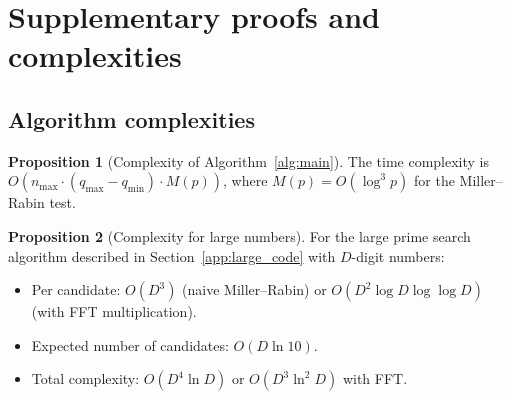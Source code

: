\documentclass[11pt,a4paper]{article}
\theoremstyle{definition}
\newtheorem{proposition}{Proposition}[section]
\theoremstyle{plain}
\begin{document}
\section{Supplementary proofs and complexities}
\label{app:proofs}

\subsection{Algorithm complexities}

\begin{proposition}[Complexity of Algorithm~\ref{alg:main}]
The time complexity is $O(n_{\max} \cdot (q_{\max} - q_{\min}) \cdot M(p))$, where $M(p) = O(\log^3 p)$ for the Miller--Rabin test.
\end{proposition}

\begin{proposition}[Complexity for large numbers]
For the large prime search algorithm described in Section~\ref{app:large_code} with $D$-digit numbers:
\begin{itemize}[leftmargin=*]
    \item Per candidate: $O(D^3)$ (naive Miller--Rabin) or $O(D^2 \log D \log \log D)$ (with FFT multiplication).
    \item Expected number of candidates: $O(D \ln 10)$.
    \item Total complexity: $O(D^4 \ln D)$ or $O(D^3 \ln^2 D)$ with FFT.
\end{itemize}
\end{proposition}
\end{document}
